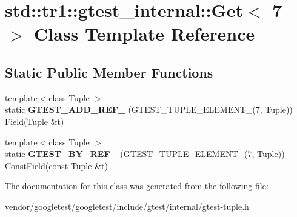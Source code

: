 \hypertarget{classstd_1_1tr1_1_1gtest__internal_1_1Get_3_017_01_4}{}\section{std\+:\+:tr1\+:\+:gtest\+\_\+internal\+:\+:Get$<$ 7 $>$ Class Template Reference}
\label{classstd_1_1tr1_1_1gtest__internal_1_1Get_3_017_01_4}
\subsection*{Static Public Member Functions}
\begin{DoxyCompactItemize}
\item 
{\footnotesize template$<$class Tuple $>$ }\\static {\bfseries G\+T\+E\+S\+T\+\_\+\+A\+D\+D\+\_\+\+R\+E\+F\+\_\+} (G\+T\+E\+S\+T\+\_\+\+T\+U\+P\+L\+E\+\_\+\+E\+L\+E\+M\+E\+N\+T\+\_\+(7, Tuple)) Field(Tuple \&t)\hypertarget{classstd_1_1tr1_1_1gtest__internal_1_1Get_3_017_01_4_ae1245f00b2ad610a130681b5bc81051c}{}\label{classstd_1_1tr1_1_1gtest__internal_1_1Get_3_017_01_4_ae1245f00b2ad610a130681b5bc81051c}

\item 
{\footnotesize template$<$class Tuple $>$ }\\static {\bfseries G\+T\+E\+S\+T\+\_\+\+B\+Y\+\_\+\+R\+E\+F\+\_\+} (G\+T\+E\+S\+T\+\_\+\+T\+U\+P\+L\+E\+\_\+\+E\+L\+E\+M\+E\+N\+T\+\_\+(7, Tuple)) Const\+Field(const Tuple \&t)\hypertarget{classstd_1_1tr1_1_1gtest__internal_1_1Get_3_017_01_4_afb7bd56e0697304325cd157d11df4a7b}{}\label{classstd_1_1tr1_1_1gtest__internal_1_1Get_3_017_01_4_afb7bd56e0697304325cd157d11df4a7b}

\end{DoxyCompactItemize}


The documentation for this class was generated from the following file\+:\begin{DoxyCompactItemize}
\item 
vendor/googletest/googletest/include/gtest/internal/gtest-\/tuple.\+h\end{DoxyCompactItemize}
